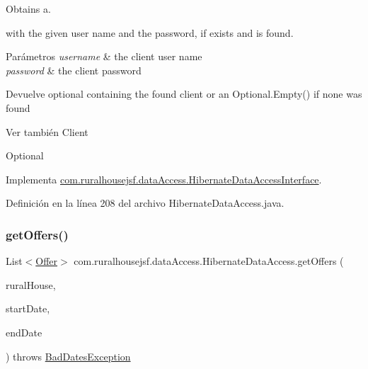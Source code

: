 Obtains a. 


\begin{DoxyCode}{0}
\end{DoxyCode}
 with the given user name and the password, if exists and is found.


\begin{DoxyParams}{Parámetros}
{\em username} & the client user name \\
\hline
{\em password} & the client password\\
\hline
\end{DoxyParams}
\begin{DoxyReturn}{Devuelve}
optional containing the found client or an {\ttfamily Optional.\+Empty()} if none was found
\end{DoxyReturn}
\begin{DoxySeeAlso}{Ver también}
Client 

Optional 
\end{DoxySeeAlso}


Implementa \mbox{\hyperlink{a00148_abf581529aefd317dffd1d2ca0906c3ac}{com.\+ruralhousejsf.\+data\+Access.\+Hibernate\+Data\+Access\+Interface}}.



Definición en la línea 208 del archivo Hibernate\+Data\+Access.\+java.

\mbox{\label{a00144_a54bd9542b20644ccd47961ca260d17b4}} 
\subsubsection{\texorpdfstring{getOffers()}{getOffers()}\hspace{0.1cm}{\footnotesize\ttfamily [1/2]}}
{\footnotesize\ttfamily List$<$\mbox{\hyperlink{a00184}{Offer}}$>$ com.\+ruralhousejsf.\+data\+Access.\+Hibernate\+Data\+Access.\+get\+Offers (\begin{DoxyParamCaption}\item[{\mbox{\hyperlink{a00188}{Rural\+House}}}]{rural\+House,  }\item[{Local\+Date}]{start\+Date,  }\item[{Local\+Date}]{end\+Date }\end{DoxyParamCaption}) throws \mbox{\hyperlink{a00208}{Bad\+Dates\+Exception}}}



